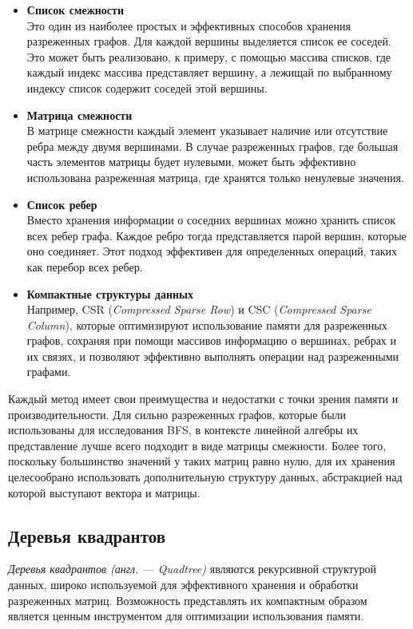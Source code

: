 \begin{itemize}
	\item{\textbf{Список смежности}} \\
	Это один из наиболее простых и эффективных способов хранения разреженных графов. Для каждой вершины выделяется список ее соседей. Это может быть реализовано, к примеру, с помощью массива списков, где каждый индекс массива представляет вершину, а лежищай по выбранному индексу список содержит соседей этой вершины.
    \item{\textbf{Матрица смежности}} \\ 
    В матрице смежности каждый элемент указывает наличие или отсутствие ребра между двумя вершинами. В случае разреженных графов, где большая часть элементов матрицы будет нулевыми, может быть эффективно использована разреженная матрица, где хранятся только ненулевые значения.
    \item{\textbf{Список ребер}} \\ 
    Вместо хранения информации о соседних вершинах можно хранить список всех ребер графа. Каждое ребро тогда представляется парой вершин, которые оно соединяет. Этот подход эффективен для определенных операций, таких как перебор всех ребер.
    \item{\textbf{Компактные структуры данных}} \\
    Например, CSR (\textit{Compressed Sparse Row}) и CSC (\textit{Compressed Sparse Column}), которые оптимизируют использование памяти для разреженных графов, сохраняя при помощи массивов информацию о вершинах, ребрах и их связях, и позволяют эффективно выполнять операции над разреженными графами.
\end{itemize}

\noindent Каждый метод имеет свои преимущества и недостатки с точки зрения памяти и производительности. Для сильно разреженных графов, которые были использованы для исследования BFS, в контексте линейной алгебры их представление лучше всего подходит в виде матрицы смежности. Более того, поскольку большинство значений у таких матриц равно нулю, для их хранения целесообрано использовать дополнительную структуру данных, абстракцией над которой выступают вектора и матрицы.



\subsection{Деревья квадрантов}
\noindent \textit{Деревья квадрантов (англ. --- Quadtree)} являются рекурсивной структурой данных, широко используемой для эффективного хранения и обработки разреженных матриц. Возможность представлять их компактным образом является ценным инструментом для оптимизации использования памяти.

